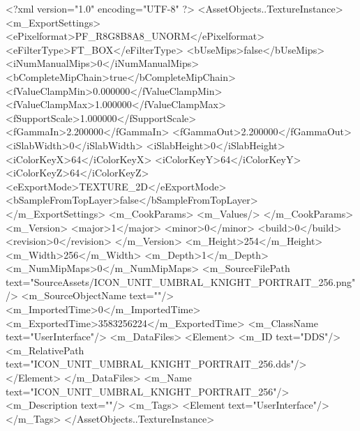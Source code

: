 <?xml version="1.0" encoding="UTF-8" ?>
<AssetObjects..TextureInstance>
	<m_ExportSettings>
		<ePixelformat>PF_R8G8B8A8_UNORM</ePixelformat>
		<eFilterType>FT_BOX</eFilterType>
		<bUseMips>false</bUseMips>
		<iNumManualMips>0</iNumManualMips>
		<bCompleteMipChain>true</bCompleteMipChain>
		<fValueClampMin>0.000000</fValueClampMin>
		<fValueClampMax>1.000000</fValueClampMax>
		<fSupportScale>1.000000</fSupportScale>
		<fGammaIn>2.200000</fGammaIn>
		<fGammaOut>2.200000</fGammaOut>
		<iSlabWidth>0</iSlabWidth>
		<iSlabHeight>0</iSlabHeight>
		<iColorKeyX>64</iColorKeyX>
		<iColorKeyY>64</iColorKeyY>
		<iColorKeyZ>64</iColorKeyZ>
		<eExportMode>TEXTURE_2D</eExportMode>
		<bSampleFromTopLayer>false</bSampleFromTopLayer>
	</m_ExportSettings>
	<m_CookParams>
		<m_Values/>
	</m_CookParams>
	<m_Version>
		<major>1</major>
		<minor>0</minor>
		<build>0</build>
		<revision>0</revision>
	</m_Version>
	<m_Height>254</m_Height>
	<m_Width>256</m_Width>
	<m_Depth>1</m_Depth>
	<m_NumMipMaps>0</m_NumMipMaps>
	<m_SourceFilePath text="SourceAssets/ICON_UNIT_UMBRAL_KNIGHT_PORTRAIT_256.png"/>
	<m_SourceObjectName text=""/>
	<m_ImportedTime>0</m_ImportedTime>
	<m_ExportedTime>3583256224</m_ExportedTime>
	<m_ClassName text="UserInterface"/>
	<m_DataFiles>
		<Element>
			<m_ID text="DDS"/>
			<m_RelativePath text="ICON_UNIT_UMBRAL_KNIGHT_PORTRAIT_256.dds"/>
		</Element>
	</m_DataFiles>
	<m_Name text="ICON_UNIT_UMBRAL_KNIGHT_PORTRAIT_256"/>
	<m_Description text=""/>
	<m_Tags>
		<Element text="UserInterface"/>
	</m_Tags>
</AssetObjects..TextureInstance>

